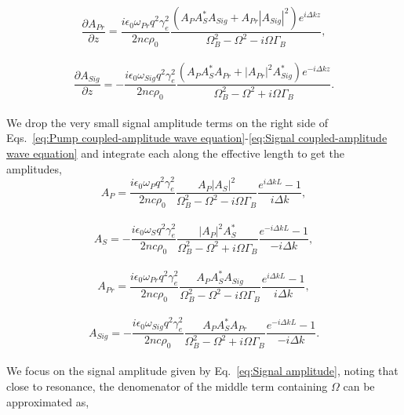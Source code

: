 \begin{equation}
    \frac{\partial A_{Pr}}{\partial z} = \frac{i\epsilon_{0}\omega_{Pr} q^{2}\gamma_{e}^{2}}{2nc\rho_{0}}\frac{(A_{P}A_{S}^{*}A_{Sig} + A_{Pr}|A_{Sig}|^{2})e^{i\Delta kz}}{\Omega_{B}^{2} - \Omega^{2} - i\Omega\Gamma_{B}},
\end{equation}
\\
\begin{equation}
    \frac{\partial A_{Sig}}{\partial z} = -\frac{i\epsilon_{0}\omega_{Sig} q^{2}\gamma_{e}^{2}}{2nc\rho_{0}}\frac{(A_{P}A_{S}^{*}A_{Pr} + |A_{Pr}|^{2}A_{Sig}^{*})e^{-i\Delta kz}}{\Omega_{B}^{2} - \Omega^{2} + i\Omega\Gamma_{B}}.
    \label{eq:Signal coupled-amplitude wave equation}
\end{equation}
\\
We drop the very small signal amplitude terms on the right side of Eqs.~\ref{eq:Pump coupled-amplitude wave equation}-\ref{eq:Signal coupled-amplitude wave equation} and integrate each along the effective length to get the amplitudes,
\\
\begin{equation}
  A_{P} = \frac{i\epsilon_{0}\omega_{P}q^{2}\gamma_{e}^{2}}{2nc\rho_{0}}\frac{A_{P}|A_{S}|^{2}}{\Omega_{B}^{2} - \Omega^{2} - i\Omega\Gamma_{B}} \frac{e^{i\Delta kL} - 1}{i\Delta k},
\end{equation}
\\
\begin{equation}
  A_{S} = -\frac{i\epsilon_{0}\omega_{S}q^{2}\gamma_{e}^{2}}{2nc\rho_{0}}\frac{|A_{P}|^{2}A_{S}^{*}}{\Omega_{B}^{2} - \Omega^{2} + i\Omega\Gamma_{B}} \frac{e^{-i\Delta kL} - 1}{-i\Delta k},
\end{equation}
\\
\begin{equation}
  A_{Pr} = \frac{i\epsilon_{0}\omega_{Pr}q^{2}\gamma_{e}^{2}}{2nc\rho_{0}}\frac{A_{P}A_{S}^{*}A_{Sig}}{\Omega_{B}^{2} - \Omega^{2} - i\Omega\Gamma_{B}} \frac{e^{i\Delta kL} - 1}{i\Delta k},
\end{equation}
\\
\begin{equation}
  A_{Sig} = -\frac{i\epsilon_{0}\omega_{Sig}q^{2}\gamma_{e}^{2}}{2nc\rho_{0}}\frac{A_{P}A_{S}^{*}A_{Pr}}{\Omega_{B}^{2} - \Omega^{2} + i\Omega\Gamma_{B}} \frac{e^{-i\Delta kL} - 1}{-i\Delta k}.
  \label{eq:Signal amplitude}
\end{equation}
\\
We focus on the signal amplitude given by Eq.~\ref{eq:Signal amplitude}, noting that close to resonance, the denomenator of the middle term containing \(\Omega\) can be approximated as,
